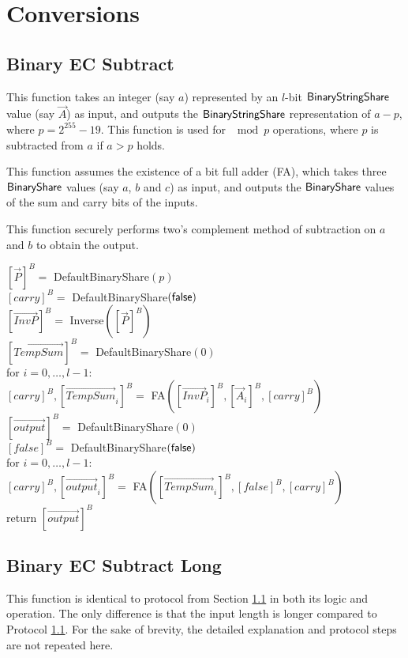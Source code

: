 \section{Conversions}
\label{sec:conversions}


\subsection{Binary EC Subtract}
\label{sec:binary_ec_subtract}

This function takes an integer (say $a$) represented by an $l$-bit ${\mathsf{BinaryStringShare}}$ value (say $\vec{A}$) as input, and outputs the ${\mathsf{BinaryStringShare}}$ representation of $a - p$, where $p = 2^{255} - 19$. This function is used for $\mod p$ operations, where $p$ is subtracted from $a$ if $a > p$ holds.

This function assumes the existence of a bit full adder (FA), which takes three ${\mathsf{BinaryShare}}$ values (say $a$, $b$ and $c$) as input, and outputs the ${\mathsf{BinaryShare}}$ values of the sum and carry bits of the inputs.

This function securely performs two's complement method of subtraction on $a$ and $b$ to obtain the output.

\begin{protocol}[BinaryECSubtract$({[\vec{A}]^B})$]
	${[\vec{P}]^B} =$ DefaultBinaryShare$(p)$\\
	$[carry]^B = $ DefaultBinaryShare$(\mathsf{false})$ \\
	${[\vec{InvP}]^B} =$ Inverse$({[\vec{P}]^B})$\\
	$[\vec{TempSum}]^B = $ DefaultBinaryShare$(0)$ \\
	for $i = 0, \ldots, l - 1$:\\
	\indent $[carry]^B, [\vec{TempSum}_i]^B =$ FA$([\vec{InvP}_i]^B, [\vec{A}_i]^B, [carry]^B)$\\
	$[\vec{output}]^B = $ DefaultBinaryShare$(0)$ \\
	$[false]^B = $ DefaultBinaryShare$(\mathsf{false})$ \\
	for $i = 0, \ldots, l - 1$:\\
	\indent $[carry]^B, [\vec{output}_i]^B =$ FA$([\vec{TempSum}_i]^B, [false]^B, [carry]^B)$\\
	return $[\vec{output}]^B$
\end{protocol}

\subsection{Binary EC Subtract Long}
\label{sec:binary_ec_subtract_long}

This function is identical to protocol from Section \ref{sec:binary_ec_subtract} in both its logic and operation. The only difference is that the input length is longer compared to Protocol \ref{sec:binary_ec_subtract}. For the sake of brevity, the detailed explanation and protocol steps are not repeated here.